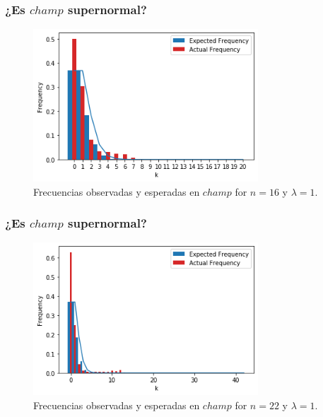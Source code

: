\documentclass[10pt,mathserif]{beamer}%
\begin{document}
\begin{frame}
  \frametitle{¿Es $champ$ supernormal?}
  \begin{figure}[h]
    \includegraphics[width=0.75\textwidth]{imagenes/champ-16-freq.png}
    \centering
    \caption{Frecuencias observadas y esperadas en $champ$ for $n = 16$ y $\lambda = 1$.}
    \label{fig-16-freq}
\end{figure}
\end{frame}

\begin{frame}
  \frametitle{¿Es $champ$ supernormal?}
  \begin{figure}[h]
    \includegraphics[width=0.75\textwidth]{imagenes/champ-22-freq.png}
    \centering
    \caption{Frecuencias observadas y esperadas en $champ$ for $n = 22$ y $\lambda = 1$.}
    \label{fig:champ-22-freq}
\end{figure}
\end{frame}
\end{document}
